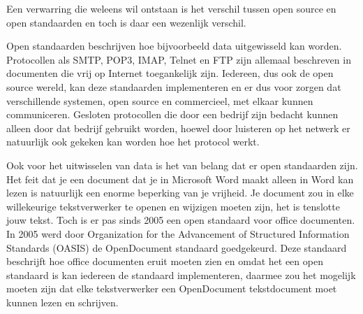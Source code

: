 Een verwarring die weleens wil ontstaan is het verschil tussen open source en open standaarden en toch is daar een
wezenlijk verschil.\par

Open standaarden beschrijven hoe bijvoorbeeld data uitgewisseld kan worden. Protocollen als SMTP, POP3, IMAP, Telnet en
FTP zijn allemaal beschreven in documenten die vrij op Internet toegankelijk zijn. Iedereen, dus ook de open source
wereld, kan deze standaarden implementeren en er dus voor zorgen dat verschillende systemen, open source en
commercieel, met elkaar kunnen communiceren. Gesloten protocollen die door een bedrijf zijn bedacht kunnen alleen door
dat bedrijf gebruikt worden, hoewel door luisteren op het netwerk er natuurlijk ook gekeken kan worden hoe het protocol
werkt.

Ook voor het uitwisselen van data is het van belang dat er open standaarden zijn. Het feit dat je een document dat je in Microsoft Word maakt alleen in Word kan lezen is natuurlijk een enorme beperking van je vrijheid. Je document zou in elke willekeurige tekstverwerker te openen en wijzigen moeten zijn, het is tenslotte jouw tekst. Toch is er pas sinds 2005 een open standaard voor office documenten. In 2005 werd door Organization for the Advancement of Structured Information Standards (OASIS) de OpenDocument standaard goedgekeurd. Deze standaard beschrijft hoe office documenten eruit moeten zien en omdat het een open standaard is kan iedereen de standaard implementeren, daarmee zou het mogelijk moeten zijn dat elke tekstverwerker een OpenDocument tekstdocument moet kunnen lezen en schrijven.
